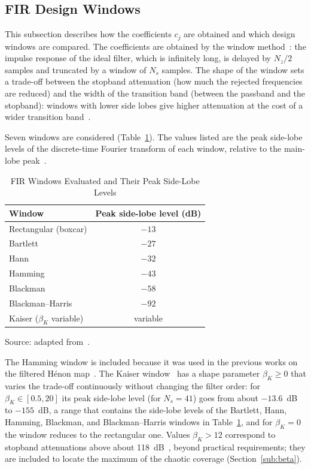 \documentclass[journal]{IEEEtran}
\begin{document}
\subsection{FIR Design Windows}\label{sub:windows}
This subsection describes how the coefficients $c_j$ are obtained and which
design windows are compared. The coefficients are obtained by the window
method~\cite{Oppenheim2009,Harris1978}: the impulse response of the ideal
filter, which is infinitely long, is delayed by $N_z/2$ samples and truncated by
a window of $N_s$ samples. The shape of the window sets a trade-off between the stopband attenuation (how much
the rejected frequencies are reduced) and the width of the transition band (between
the passband and the stopband): windows with lower side lobes give higher attenuation
at the cost of a wider transition band~\cite{Harris1978}.

Seven windows are considered (Table~\ref{tab:windows}). The values listed
are the peak side-lobe levels of the discrete-time Fourier transform of each
window, relative to the main-lobe peak~\cite{Harris1978}.

\begin{table}[!t]
\caption{FIR Windows Evaluated and Their Peak Side-Lobe Levels\label{tab:windows}}
\centering
\begin{tabular}{lc}
\toprule
\textbf{Window} & \textbf{Peak side-lobe level (dB)} \\
\midrule
Rectangular (boxcar)          & $-13$    \\
Bartlett                      & $-27$    \\
Hann                          & $-32$    \\
Hamming                       & $-43$    \\
Blackman                      & $-58$    \\
Blackman--Harris              & $-92$    \\
Kaiser ($\beta_K$ variable)   & variable \\
\bottomrule
\end{tabular}

\vspace{2pt}
{\footnotesize Source: adapted from~\cite{Harris1978}.}
\end{table}

The Hamming window is included because it was used in the previous works on the
filtered H\'enon map~\cite{Fontes2017,BorgesCNSNS2024,Borges2022sbrt}. The Kaiser
window~\cite{Kaiser1980} has a shape parameter $\beta_K\ge0$ that varies the
trade-off continuously without changing the filter order: for
$\beta_K\in[0.5,20]$ its peak side-lobe level (for $N_s = 41$) goes from about
$-13.6$~dB to $-155$~dB, a
range that contains
the side-lobe levels of the Bartlett, Hann, Hamming, Blackman, and
Blackman--Harris windows in Table~\ref{tab:windows}, and for $\beta_K=0$ the
window reduces to the rectangular one. Values $\beta_K>12$
correspond to stopband attenuations above about 118~dB~\cite{Oppenheim2009},
beyond practical requirements; they are included to locate the maximum of the
chaotic coverage (Section~\ref{sub:beta}).
\end{document}
